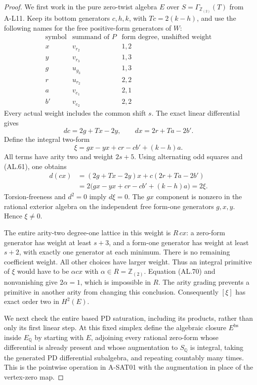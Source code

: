\begin{proof}
We first work in the pure zero-twist algebra $E$
over $S=\Gamma_{\mathbb Z_{(2)}}(T)$ from A-L11.
Keep its bottom generators $c,h,k$, with
$Tc=2(k-h)$, and use the following names for
the free positive-form generators of $W$:
\[
 \begin{array}{c|c|c}
 \text{symbol}&\text{summand of }P&
                  \text{form degree, unshifted weight}\\\hline
 x&v_{r_2}&1,2\\
 y&v_{r_3}&1,3\\
 g&u_{g_3}&1,3\\
 r&u_{r_2}&2,2\\
 a&v_{e_1}&2,1\\
 b'&v_{e_2}&2,2
 \end{array}
\]
Every actual weight includes the common shift $s$.
The exact linear differential gives
\[
 dc=2g+Tx-2y,\qquad
 dx=2r+Ta-2b'.                                      \tag{AL.68}
\]
Define the integral two-form
\[
 \xi=gx-yx+cr-cb'+(k-h)a.                           \tag{AL.69}
\]
All terms have arity two and weight $2s+5$.
Using alternating odd squares and (AL.61), one obtains
\[
 \begin{split}
 d(cx)&=(2g+Tx-2y)x+c(2r+Ta-2b')\\
      &=2\bigl(gx-yx+cr-cb'+(k-h)a\bigr)
        =2\xi.
 \end{split}                                       \tag{AL.70}
\]
Torsion-freeness and $d^2=0$ imply $d\xi=0$.
The $gx$ component is nonzero in the rational
exterior algebra on the independent free
form-one generators $g,x,y$.
Hence $\xi\ne0$.

The entire arity-two degree-one lattice in this
weight is $R\,cx$: a zero-form generator has
weight at least $s+3$, and a form-one generator
has weight at least $s+2$, with exactly one
generator at each minimum.  There is no remaining
coefficient weight.  All other choices have larger
weight.  Thus an integral primitive of $\xi$
would have to be $\alpha cx$ with
$\alpha\in R=\mathbb Z_{(2)}$.
Equation (AL.70) and nonvanishing give $2\alpha=1$,
which is impossible in $R$.
The arity grading prevents a primitive in another
arity from changing this conclusion.
Consequently $[\xi]$ has exact order two in $H^2(E)$.

We next check the entire based PD saturation,
including its products, rather than only its
first linear step.  At this fixed simplex define
the algebraic closure $E^{\mathrm{bs}}$ inside
$E_{\mathbb Q}$ by starting with $E$, adjoining
every rational zero-form whose differential is
already present and whose augmentation to
$S_{\mathbb Q}$ is integral, taking the generated
PD differential subalgebra, and repeating countably
many times.  This is the pointwise operation in
A-SAT01 with the augmentation in place of the
vertex-zero map.


\end{proof}
